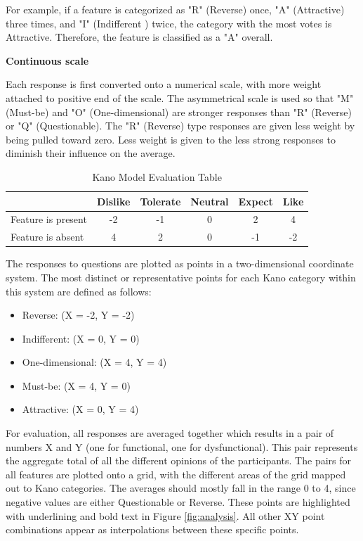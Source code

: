 \documentclass[../main.tex]{subfiles}
\begin{document}
For example, if a feature is categorized as "R" (Reverse) once, "A" (Attractive) three times, and "I" (Indifferent ) twice, the category with the most votes is Attractive. Therefore, the feature is classified as a "A" overall.

\textbf{Continuous scale}

Each response is first converted onto a numerical scale, with more weight attached to positive end of the scale. The asymmetrical scale is used so that "M" (Must-be) and "O" (One-dimensional) are stronger responses than "R" (Reverse) or "Q" (Questionable). The "R" (Reverse) type responses are given less weight by being pulled toward zero. Less weight is given to the less strong responses to diminish their influence on the average. \cite{berger1993kano} 

\begin{table}[H]
    \centering
    \begin{tabular}{lccccc}
        \hline
        & Dislike & Tolerate & Neutral & Expect & Like \\
        \hline
        Feature is present & -2 & -1 & 0 & 2 & 4 \\
        Feature is absent  & 4  & 2  & 0 & -1 & -2 \\
        \hline
    \end{tabular}
    \caption{Kano Model Evaluation Table}
    \label{tab:kano}
\end{table}

The responses to questions are plotted as points in a two-dimensional coordinate system. The most distinct or representative points for each Kano category within this system are defined as follows:  

\begin{itemize}
    \item[] Reverse: (X = -2, Y = -2)
    \item[] Indifferent: (X = 0, Y = 0)
    \item[] One-dimensional: (X = 4, Y = 4)
    \item[] Must-be: (X = 4, Y = 0)
    \item[] Attractive: (X = 0, Y = 4)
\end{itemize}

For evaluation, all responses are averaged together which results in a pair of numbers X and Y (one for functional, one for dysfunctional). This pair represents the aggregate total of all the different opinions of the participants. The pairs for all features are plotted onto a grid, with the different areas of the grid mapped out to Kano categories. The averages should mostly fall in the range 0 to 4, since negative values are either Questionable or Reverse. These points are highlighted with underlining and bold text in Figure \ref{fig:analysis}. All other XY point combinations appear as interpolations between these specific points. \cite{berger1993kano}
\end{document}
